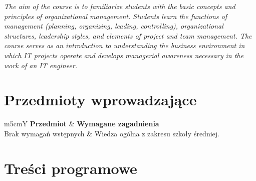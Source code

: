 \documentclass[12pt, a4paper]{article}
\newcommand{\thdrule}{\noalign{\global\setlength{\extrarowheight}{0pt}}}
\newcommand{\thdend}{\noalign{\global\setlength{\extrarowheight}{3pt}}}
\begin{document}
\textit{The aim of the course is to familiarize students with the basic concepts and principles of organizational management. Students learn the functions of management (planning, organizing, leading, controlling), organizational structures, leadership styles, and elements of project and team management. The course serves as an introduction to understanding the business environment in which IT projects operate and develops managerial awareness necessary in the work of an IT engineer.}


\section{Przedmioty wprowadzające}

{\scriptsize
\begin{tabularx}{\textwidth}{m{5cm}Y}
\thdrule\toprule
{} {\color{white}\textbf{Przedmiot}} & {\color{white}\textbf{Wymagane zagadnienia}} \\
\midrule\thdend
   Brak wymagań wstępnych & Wiedza ogólna z zakresu szkoły średniej. \\
\bottomrule
\end{tabularx}}

\section{Treści programowe}
\end{document}
